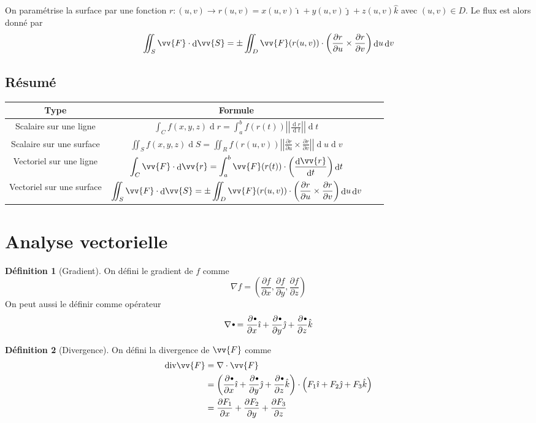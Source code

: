 \documentclass[11pt,a4paper]{article}
\theoremstyle{definition}
\newtheorem{mydef}{Définition}%
\newcommand{\kmath}{k}
\DeclareMathOperator{\diff}{d}
\newcommand{\dif}{\diff\!}
\renewcommand{\div}{\mathrm{div}}
\newcommand{\sbt}{\,\begin{picture}(-1,1)(-1,-3)\circle*{2.5}\end{picture}\ }
\newcommand{\pa}{\partial}
\begin{document}
On paramétrise la surface par une fonction $r : (u,v) \to r(u,v) = x(u,v) \hat{\imath} + y(u,v) \hat{\jmath} + z(u,v) \hat{\kmath}$ avec $(u,v) \in D$. Le flux est alors donné par
\[ \iint_S \vv{F} \cdot \dif \vv{S} = \pm \iint_D \vv{F}(r(u,v)) \cdot \left( \frac{\pa r}{\pa u} \times \frac{\pa r}{\pa v} \right) \dif u \dif v \]

\subsection{Résumé}

\begin{center}
	\begin{tabular}{|S c|S c|}
		\hline
		\textbf{Type} & \textbf{Formule} \\
		\hline
		Scalaire sur une ligne & $\displaystyle \int_C f(x,y,z) \dif r = \int_a^b f(r(t)) \left|\left| \frac{\dif r}{\dif t} \right| \right| \dif t$ \\
		\hline
		Scalaire sur une surface & $\displaystyle \iint_S f(x,y,z) \dif S = \iint_R f(r(u,v)) \left| \left| \frac{\pa r}{\pa u} \times \frac{\pa r}{\pa v} \right| \right| \dif u \dif v $ \\
		\hline
		Vectoriel sur une ligne & $ \displaystyle \int_C \vv{F} \cdot \dif \vv{r} = \int_a^b \vv{F}(r(t)) \cdot \left(  \frac{\dif \vv{r}}{\dif t} \right) \dif t $ \\
		\hline
		Vectoriel sur une surface & $ \displaystyle \iint_S \vv{F} \cdot \dif \vv{S} = \pm \iint_D \vv{F}(r(u,v)) \cdot \left( \frac{\pa r}{\pa u} \times \frac{\pa r}{\pa v} \right) \dif u \dif v $ \\
		\hline
	\end{tabular}
\end{center}

\section{Analyse vectorielle}

\begin{mydef}[Gradient] On défini le gradient de $f$ comme
	\[ \nabla f = \left( \frac{\pa f}{\pa x} , \frac{\pa f}{\pa y} , \frac{\pa f}{\pa z} \right) \]
	On peut aussi le définir comme opérateur
	\[ \nabla \sbt =
	\frac{\pa \sbt}{\pa x} \hat{\imath} + \frac{\pa \sbt}{\pa y} \hat{\jmath} + \frac{\pa \sbt}{\pa z} \hat{\kmath} \]
\end{mydef}

\begin{mydef}[Divergence] On défini la divergence de $\vv{F}$ comme
	\begin{align*} \div \vv{F} & = \nabla \cdot \vv{F} \\
		& = \left( \frac{\pa \sbt}{\pa x} \hat{\imath} + \frac{\pa \sbt}{\pa y} \hat{\jmath} + \frac{\pa \sbt}{\pa z} \hat{\kmath} \right) \cdot \left( F_1 \hat{\imath} + F_2 \hat{\jmath} + F_3 \hat{\kmath} \right) \\
		& = \frac{\pa F_1}{\pa x} + \frac{\pa F_2}{\pa y} + \frac{\pa F_3}{\pa z} \\
	\end{align*}
\end{mydef}
\end{document}
